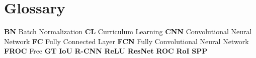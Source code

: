 % 

\chapter{Glossary}%

\textbf{BN} Batch Normalization
\bigbreak
\textbf{CL} Curriculum Learning
\bigbreak
\textbf{CNN} Convolutional Neural Network
\bigbreak
\textbf{FC} Fully Connected Layer
\bigbreak
\textbf{FCN} Fully Convolutional Neural Network
\bigbreak
\textbf{FROC} Free 
\bigbreak
\textbf{GT}
\bigbreak
\textbf{IoU}
\bigbreak
\textbf{R-CNN}
\bigbreak
\textbf{ReLU}
\bigbreak
\textbf{ResNet}
\bigbreak
\textbf{ROC}
\bigbreak
\textbf{RoI}
\bigbreak
\textbf{SPP}
\bigbreak